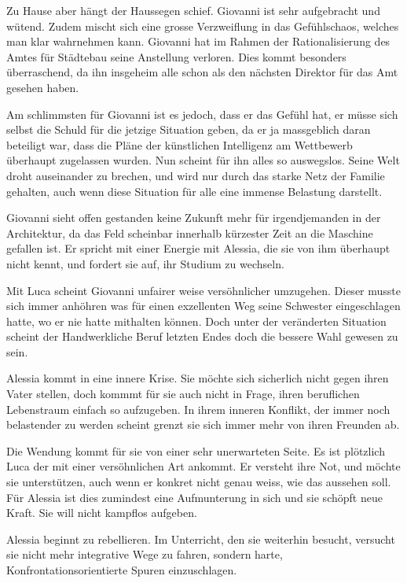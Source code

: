 \documentclass[11pt,a4paper,ngerman]{scrreprt}
\begin{document}
Zu Hause aber hängt der Haussegen schief. Giovanni ist sehr aufgebracht und
wütend. Zudem mischt sich eine grosse Verzweiflung in das Gefühlschaos, welches
man klar wahrnehmen kann. Giovanni hat im Rahmen der Rationalisierung des Amtes
für Städtebau seine Anstellung verloren. Dies kommt besonders überraschend, da
ihn insgeheim alle schon als den nächsten Direktor für das Amt gesehen haben.

Am schlimmsten für Giovanni ist es jedoch, dass er das Gefühl hat, er müsse sich
selbst die Schuld für die jetzige Situation geben, da er ja massgeblich daran
beteiligt war, dass die Pläne der künstlichen Intelligenz am Wettbewerb
überhaupt zugelassen wurden. Nun scheint für ihn alles so auswegslos. Seine Welt
droht auseinander zu brechen, und wird nur durch das starke Netz der Familie
gehalten, auch wenn diese Situation für alle eine immense Belastung darstellt.

Giovanni sieht offen gestanden keine Zukunft mehr für irgendjemanden in der
Architektur, da das Feld scheinbar innerhalb kürzester Zeit an die Maschine
gefallen ist. Er spricht mit einer Energie mit Alessia, die sie von ihm
überhaupt nicht kennt, und fordert sie auf, ihr Studium zu wechseln.

Mit Luca scheint Giovanni unfairer weise versöhnlicher umzugehen. Dieser musste
sich immer anhöhren was für einen exzellenten Weg seine Schwester eingeschlagen
hatte, wo er nie hatte mithalten können. Doch unter der veränderten Situation
scheint der Handwerkliche Beruf letzten Endes doch die bessere Wahl gewesen zu
sein.

Alessia kommt in eine innere Krise. Sie möchte sich sicherlich nicht gegen ihren
Vater stellen, doch kommmt für sie auch nicht in Frage, ihren beruflichen
Lebenstraum einfach so aufzugeben. In ihrem inneren Konflikt, der immer noch
belastender zu werden scheint grenzt sie sich immer mehr von ihren Freunden ab.

Die Wendung kommt für sie von einer sehr unerwarteten Seite. Es ist plötzlich
Luca der mit einer versöhnlichen Art ankommt. Er versteht ihre Not, und möchte
sie unterstützen, auch wenn er konkret nicht genau weiss, wie das aussehen
soll. Für Alessia ist dies zumindest eine Aufmunterung in sich und sie schöpft
neue Kraft. Sie will nicht kampflos aufgeben.

Alessia beginnt zu rebellieren. Im Unterricht, den sie weiterhin besucht,
versucht sie nicht mehr integrative Wege zu fahren, sondern harte,
Konfrontationsorientierte Spuren einzuschlagen.
\end{document}
